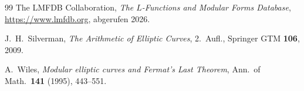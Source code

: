 \documentclass[12pt,a4paper]{article}
\theoremstyle{remark}
\begin{document}
\begin{thebibliography}{99}
The LMFDB Collaboration,
\textit{The $L$-Functions and Modular Forms Database},
\url{https://www.lmfdb.org}, abgerufen 2026.

J.~H.~Silverman,
\textit{The Arithmetic of Elliptic Curves},
2.~Aufl., Springer GTM \textbf{106}, 2009.

A.~Wiles,
\textit{Modular elliptic curves and Fermat's Last Theorem},
Ann.\ of Math.\ \textbf{141} (1995), 443--551.

\end{thebibliography}
\end{document}
